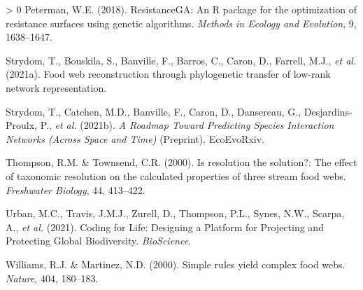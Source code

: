 \documentclass[10pt,oneside]{article}
\newlength{\cslhangindent}
\newenvironment{CSLReferences}[3] %
 {%
  \setlength{\parindent}{0pt}
  \ifodd #1 \everypar{\setlength{\hangindent}{\cslhangindent}}\ignorespaces\fi
  \ifnum #2 > 0
  \setlength{\parskip}{#2\baselineskip}
  \fi
 }%
 {}
\begin{document}
\begin{CSLReferences}{1}{0}
\leavevmode\hypertarget{ref-Peterman2018ResRP}{}%
Peterman, W.E. (2018). ResistanceGA: An R package for the optimization
of resistance surfaces using genetic algorithms. \emph{Methods in
Ecology and Evolution}, 9, 1638--1647.

\leavevmode\hypertarget{ref-Strydom2021FooWeb}{}%
Strydom, T., Bouskila, S., Banville, F., Barros, C., Caron, D., Farrell,
M.J., \emph{et al.} (2021a). Food web reconstruction through
phylogenetic transfer of low-rank network representation.

\leavevmode\hypertarget{ref-Strydom2021RoaPre}{}%
Strydom, T., Catchen, M.D., Banville, F., Caron, D., Dansereau, G.,
Desjardins-Proulx, P., \emph{et al.} (2021b). \emph{A Roadmap Toward
Predicting Species Interaction Networks (Across Space and Time)}
(Preprint). EcoEvoRxiv.

\leavevmode\hypertarget{ref-Thompson2000ResSol}{}%
Thompson, R.M. \& Townsend, C.R. (2000). Is resolution the solution?:
The effect of taxonomic resolution on the calculated properties of three
stream food webs. \emph{Freshwater Biology}, 44, 413--422.

\leavevmode\hypertarget{ref-Urban2021CodLif}{}%
Urban, M.C., Travis, J.M.J., Zurell, D., Thompson, P.L., Synes, N.W.,
Scarpa, A., \emph{et al.} (2021). Coding for Life: Designing a Platform
for Projecting and Protecting Global Biodiversity. \emph{BioScience}.

\leavevmode\hypertarget{ref-Williams2000SimRul}{}%
Williams, R.J. \& Martinez, N.D. (2000). Simple rules yield complex food
webs. \emph{Nature}, 404, 180--183.

\end{CSLReferences}
\end{document}
